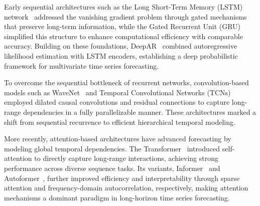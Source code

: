 Early sequential architectures such as the Long Short-Term Memory (LSTM) network~\cite{HSJ1997} addressed the vanishing gradient problem through gated mechanisms that preserve long-term information, while the Gated Recurrent Unit (GRU)~\cite{2014Learning} simplified this structure to enhance computational efficiency with comparable accuracy. Building on these foundations, DeepAR~\cite{2020DeepAR} combined autoregressive likelihood estimation with LSTM encoders, establishing a deep probabilistic framework for multivariate time series forecasting.

To overcome the sequential bottleneck of recurrent networks, convolution-based models such as WaveNet~\cite{2016WaveNet} and Temporal Convolutional Networks (TCNs)~\cite{DBLP:conf/iclr/BaiKK19} employed dilated causal convolutions and residual connections to capture long-range dependencies in a fully parallelizable manner. These architectures marked a shift from sequential recurrence to efficient hierarchical temporal modeling.

More recently, attention-based architectures have advanced forecasting by modeling global temporal dependencies. The Transformer~\cite{2017Attention} introduced self-attention to directly capture long-range interactions, achieving strong performance across diverse sequence tasks. Its variants, Informer~\cite{2020Informer} and Autoformer~\cite{2021Autoformer}, further improved efficiency and interpretability through sparse attention and frequency-domain autocorrelation, respectively, making attention mechanisms a dominant paradigm in long-horizon time series forecasting.

